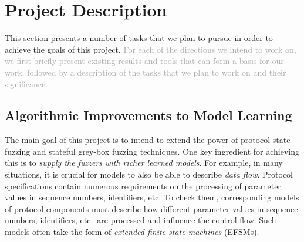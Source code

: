 \documentclass[11pt]{article}
\newcommand{\UNREVISED}[1]{\textcolor{DarkGrey}{#1}}
\begin{document}
\section{Project Description} \label{sec:description}
This section presents a number of tasks that we plan to pursue in
order to achieve the goals of this project. \UNREVISED{For each of the directions
we intend to work on, we first briefly present existing results and
tools that can form a basis for our work, followed by a description of
the tasks that we plan to work on and their significance.}

\subsection{Algorithmic Improvements to Model Learning}

%
The main goal of this project is to intend to extend the power of protocol
state fuzzing and stateful grey-box fuzzing techniques. One key ingredient for
achieving this is to \emph{supply the fuzzers with richer learned models}. For
example, in many situations, it is crucial for models to also be able to
describe \emph{data flow}. Protocol specifications contain numerous
requirements on the processing of parameter values in sequence numbers,
identifiers, etc. To check them, corresponding models of protocol components
must describe how different parameter values in sequence numbers, identifiers,
etc.\ are processed and influence the control flow. Such models often take the
form of \emph{extended finite state machines} (EFSMs).
\end{document}
